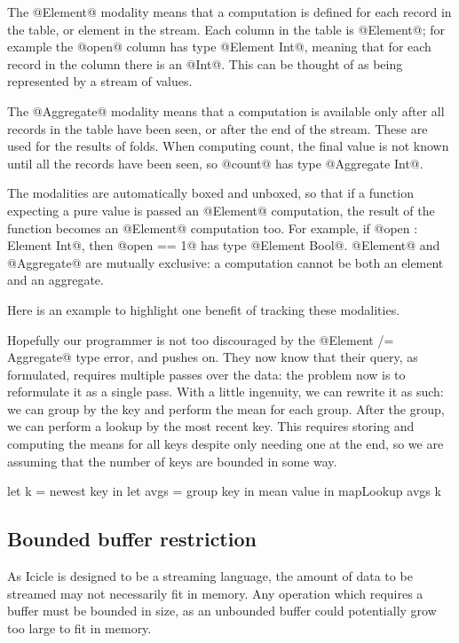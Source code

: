 The @Element@ modality means that a computation is defined for each record in the table, or element in the stream.
Each column in the table is @Element@; for example the @open@ column has type @Element Int@, meaning that for each record in the column there is an @Int@.
This can be thought of as being represented by a stream of values.

The @Aggregate@ modality means that a computation is available only after all records in the table have been seen, or after the end of the stream.
These are used for the results of folds.
When computing count, the final value is not known until all the records have been seen, so @count@ has type @Aggregate Int@.

The modalities are automatically boxed and unboxed, so that if a function expecting a pure value is passed an @Element@ computation, the result of the function becomes an @Element@ computation too.
For example, if @open : Element Int@, then @open == 1@ has type @Element Bool@.
@Element@ and @Aggregate@ are mutually exclusive: a computation cannot be both an element and an aggregate.

Here is an example to highlight one benefit of tracking these modalities.

Hopefully our programmer is not too discouraged by the @Element /= Aggregate@ type error, and pushes on.
They now know that their query, as formulated, requires multiple passes over the data: the problem now is to reformulate it as a single pass.
With a little ingenuity, we can rewrite it as such: we can group by the key and perform the mean for each group.
After the group, we can perform a lookup by the most recent key.
This requires storing and computing the means for all keys despite only needing one at the end, so we are assuming that the number of keys are bounded in some way.

\begin{code}
   let k    = newest key
in let avgs = group  key in mean value
in mapLookup avgs k
\end{code}

\subsection{Bounded buffer restriction}
\label{s:IcicleSource:bounded}
As Icicle is designed to be a streaming language, the amount of data to be streamed may not necessarily fit in memory.
Any operation which requires a buffer must be bounded in size, as an unbounded buffer could potentially grow too large to fit in memory.


